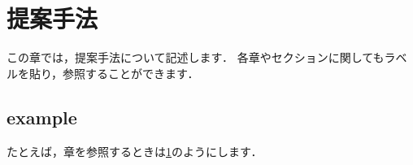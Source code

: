 


\chapter{提案手法}
\label{sec:chap_4}

この章では，提案手法について記述します．
各章やセクションに関してもラベルを貼り，参照することができます．

\section{example}

たとえば，章を参照するときは\ref{sec:chap_4}のようにします．

